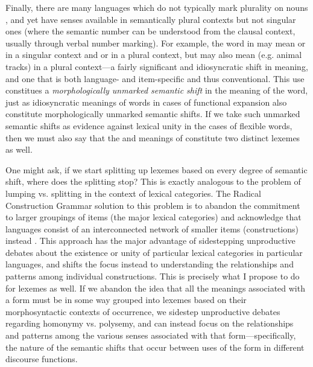 Finally, there are many languages which do not typically mark plurality on nouns \parencite{Dryer2013}, and yet have senses available in semantically plural contexts but not singular ones (where the semantic number can be understood from the clausal context, usually through verbal number marking). For example, the word  in  may mean  or  in a singular context and  or  in a plural context, but may also mean  (e.g. animal tracks) in a plural context—a fairly significant and idiosyncratic shift in meaning, and one that is both language- and item-specific and thus conventional. This use constitues a \emph{morphologically unmarked semantic shift} in the meaning of the word, just as idiosyncratic meanings of words in cases of functional expansion also constitute morphologically unmarked semantic shifts. If we take such unmarked semantic shifts as evidence against lexical unity in the cases of flexible words, then we must also say that the  and  meanings of  constitute two distinct lexemes as well.

One might ask, if we start splitting up lexemes based on every degree of semantic shift, where does the splitting stop? This is exactly analogous to the problem of lumping vs. splitting in the context of lexical categories. The Radical Construction Grammar solution to this problem is to abandon the commitment to larger groupings of items (the major lexical categories) and acknowledge that languages consist of an interconnected network of smaller items (constructions) instead \parencite{Croft2001b}. This approach has the major advantage of sidestepping unproductive debates about the existence or unity of particular lexical categories in particular languages, and shifts the focus instead to understanding the relationships and patterns among individual constructions. This is precisely what I propose to do for lexemes as well. If we abandon the idea that all the meanings associated with a form must be in some way grouped into lexemes based on their morphosyntactic contexts of occurrence, we sidestep unproductive debates regarding homonymy vs. polysemy, and can instead focus on the relationships and patterns among the various senses associated with that form—specifically, the nature of the semantic shifts that occur between uses of the form in different discourse functions.

